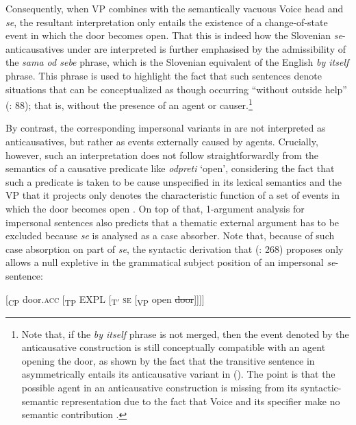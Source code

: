 \documentclass[output=paper,
modfonts,nonflat,
newtxmath
]{langsci/langscibook}
\begin{document}
\noindent Consequently, when VP combines with the semantically vacuous Voice head and \textit{se}, the resultant interpretation only entails the existence of a change-of-state event in which the door becomes open. That this is indeed how the Slovenian \textit{se}-anticausatives under  are interpreted is further emphasised by the admissibility of the \textit{sama od sebe} phrase, which is the Slovenian equivalent of the English \textit{by itself} phrase. This phrase is used to highlight the fact that such sentences denote situations that can be conceptualized as though occurring “without outside help'' (\citealt{hovav1995}: 88); that is, without the presence of an agent or causer.\footnote{Note that, if the \textit{by itself} phrase is not merged, then the event denoted by the anticausative construction is still conceptually compatible with an agent opening the door, as shown by the fact that the transitive sentence in  asymmetrically entails its anticausative variant in  (\citealt{schafervivanco2016}). The point is that the possible agent in an anticausative construction is missing from its syntactic-semantic representation due to the fact that Voice and its specifier make no semantic contribution .} \par

By contrast, the corresponding impersonal variants in  are not interpreted as anticausatives, but rather as events externally caused by agents. Crucially, however, such an interpretation does not follow straightforwardly from the semantics of a causative predicate like \textit{odpreti} `open', considering the fact that such a predicate is taken to be cause unspecified in its lexical semantics and the VP that it projects only denotes the characteristic function of a set of events in which the door becomes open . On top of that,  1-argument analysis for impersonal sentences also predicts that a thematic external argument has to be excluded because \textit{se} is analysed as a case absorber. Note that, because of such case absorption on part of \textit{se}, the syntactic derivation that \citeauthor{marelj2004} (\citeyear{marelj2004}: 268) proposes only allows a null expletive in the grammatical subject position of an impersonal \textit{se}-sentence: \par
\begin{exe}
\ex \label{ex:lenardic: 9} {[\textsubscript{CP} door.\textsc{acc} [\textsubscript{TP} EXPL [\textsubscript{T$'$} \textsc{se} [\textsubscript{VP} open \st{door}]]]]}
\end{exe} \par
\end{document}

